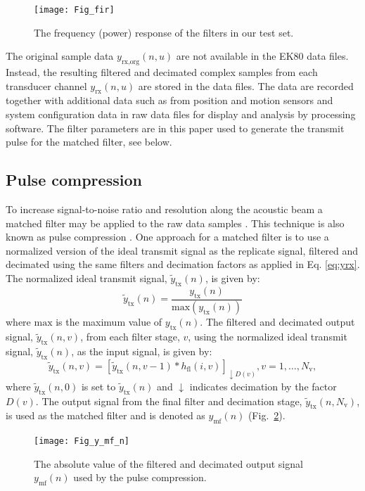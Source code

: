 \documentclass[preprint,12pt,TurnOnLineNumbers]{JASAnew}
\newcommand{\samplesymt}{n}
\newcommand{\genidxsym}{i}
\newcommand{\channelsym}{u}
\newcommand{\stagesym}{v}
\newcommand{\nstages}{N_{\textrm{v}}}
\newcommand{\ytx}{y_{\textrm{tx}}}
\newcommand{\ytxnorm}{\tilde{y}_{\textrm{tx}}}
\newcommand{\yrx}{y_{\textrm{rx}}}
\newcommand{\yrxorg}{y_{\textrm{rx,org}}}
\newcommand{\ymf}{y_{\textrm{mf}}}
\newcommand{\decfac}{D}
\newcommand{\hfl}{h_{\textrm{fl}}}
\begin{document}
\begin{figure}
\texttt{[image: Fig\_fir]}
\caption{\label{fi:fir} The frequency (power) response of the filters in our test set.}
\end{figure}

The original sample data $\yrxorg(\samplesymt,\channelsym)$ are not available in the EK80 data files. Instead, the resulting filtered and decimated complex samples from each transducer channel $\yrx(\samplesymt,\channelsym)$ are stored in the data files. The data are recorded together with additional data such as from position and motion sensors and system configuration data in raw data files for display and analysis by processing software. The filter parameters are in this paper used to generate the transmit pulse for the matched filter, see below.


\subsection{Pulse compression}
To increase signal-to-noise ratio and resolution along the acoustic beam a matched filter may be applied to the raw data samples \citep{turin1960}. This technique is also known as pulse compression \citep{klauder1960}. One approach for a matched filter is to use a normalized version of the ideal transmit signal as the replicate signal, filtered and decimated using the same filters and decimation factors as applied in Eq. \ref{eq:yrx}. The normalized ideal transmit signal, $\ytxnorm(\samplesymt)$, is given by:
%
\begin{equation}
\label{eq:ytxnorm}
\ytxnorm(\samplesymt) = \frac{\ytx(\samplesymt)}{\textrm{max}(\ytx(\samplesymt))}\end{equation}
%
where $\textrm{max}$ is the maximum value of $\ytx(\samplesymt)$. The filtered and decimated output signal, $\ytxnorm(\samplesymt,\stagesym)$, from each filter stage, $\stagesym$, using the normalized ideal transmit signal, $\ytxnorm(\samplesymt)$, as the input signal, is given by:
%
\begin{equation}
\label{eq:FilterStagesTX}
\ytxnorm(\samplesymt,\stagesym) = \left[ \ytxnorm(\samplesymt,\stagesym-1) * \hfl(\genidxsym,\stagesym) \right]_{\downarrow \decfac(\stagesym)}, 
\stagesym = 1,\ldots,\nstages,
\end{equation}
%
where $\ytxnorm(\samplesymt,0)$ is set to $\ytxnorm(\samplesymt)$ and $\downarrow$ indicates decimation by the factor $\decfac(\stagesym)$. The output signal from the final filter and decimation stage, $\ytxnorm(\samplesymt,\nstages)$, is used as the matched filter and is denoted as $\ymf(\samplesymt)$  (Fig.~\ref{fi:y_mf_n}).
%
\begin{figure}
\texttt{[image: Fig\_y\_mf\_n]}
\caption{\label{fi:y_mf_n} The absolute value of the filtered and decimated output signal $\ymf(\samplesymt)$ used by the pulse compression.}
\end{figure}
\end{document}
